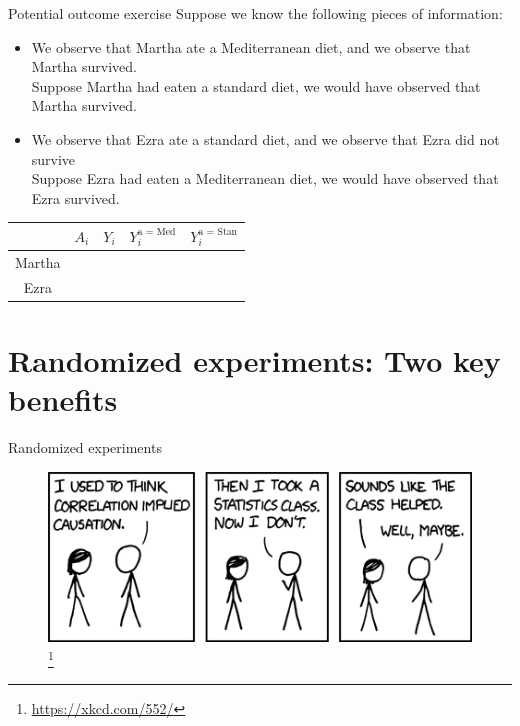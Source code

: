 \documentclass{beamer}
\begin{document}
\begin{frame}{Potential outcome exercise}
Suppose we know the following pieces of information:
{\small
\begin{itemize}
\item We observe that Martha ate a Mediterranean diet, and we observe that Martha survived.
\\ Suppose Martha had eaten a standard diet, we would have observed that Martha survived. 
\item We observe that Ezra ate a standard diet, and we observe that Ezra did not survive
\\ Suppose Ezra had eaten a Mediterranean diet, we would have observed that Ezra survived. 
\end{itemize}
}

\begin{table}
  \renewcommand*{\arraystretch}{2}
\begin{tabular}[t]{c|c|c| c|c}
  & $A_i$ & $Y_i$ & $Y_i^{\text{a = Med}}$ & $Y_i^{\text{a = Stan}}$\\
\hline
Martha & \qquad \qquad \qquad & \qquad \qquad \qquad & \qquad & \qquad\\ \hline
Ezra & \qquad \qquad & \qquad \qquad & \qquad & \qquad\\
\end{tabular}
\end{table}

\end{frame}


\section{Randomized experiments: Two key benefits}



\begin{frame}{Randomized experiments}

\begin{figure}
    \centering
    \includegraphics[scale = .7]{figures/correlation.png}\footnote{\url{https://xkcd.com/552/}}
\end{figure}
\end{frame}
\end{document}
